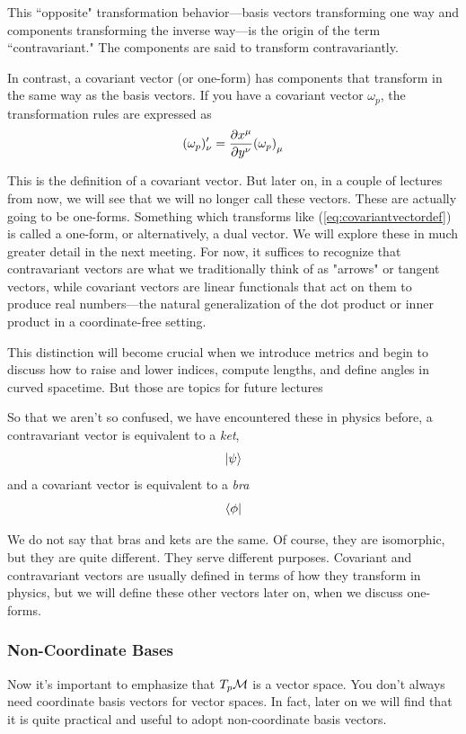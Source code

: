 		This ``opposite" transformation behavior—basis vectors transforming one way and components transforming the
		inverse way—is the origin of the term ``contravariant." The components are said to transform contravariantly.

		In contrast, a covariant vector (or one-form) has components that transform in the same way as the basis vectors.
		If you have a covariant vector $\omega_p$, the transformation rules are expressed as
		\begin{equation}
			\label{eq:covariantvectordef}
			(\omega_p)'_\nu = 
			\pdv{x^\mu}{y^\nu} \pqty{\omega_p}_\mu 
		\end{equation}

		This is the definition of a covariant vector. But later on, in a couple of lectures from now,
		we will see that we will no longer call these vectors. These are actually going to be one-forms.
		Something which transforms like (\ref{eq:covariantvectordef}) is called a one-form, or alternatively, a
		dual vector.
		We will explore these in much greater detail in the next meeting. For now, it suffices to recognize that contravariant 
		vectors are what we traditionally think of as "arrows" or tangent vectors, while covariant vectors are linear functionals 
		that act on them to produce real numbers—the natural generalization of the dot product or inner product in a coordinate-free setting.

		This distinction will become crucial when we introduce metrics and begin to discuss how to raise and lower indices,
		compute lengths, and define angles in curved spacetime. But those are topics for future lectures

		So that we aren't so confused, we have encountered these in physics before, a contravariant vector is equivalent to a \textit{ket},
		\[
			\ket{\psi}
		\]
		and a covariant vector is equivalent to a \textit{bra}
		\[
			\bra{\phi}
		\]

		We do not say that bras and kets are the same. Of course, they are isomorphic, but they
		are quite different. They serve different purposes.
		Covariant and contravariant vectors are usually defined in terms of how they
		transform in physics, but we will define these other vectors later on, when we discuss one-forms.
\newpage
	\subsubsection{Non-Coordinate Bases}

		Now it's important to emphasize that $T_p \mathcal{M}$ is a vector space. You don't always need coordinate basis vectors for vector spaces.
		In fact, later on we will find that it is quite practical and useful to adopt non-coordinate basis vectors.

